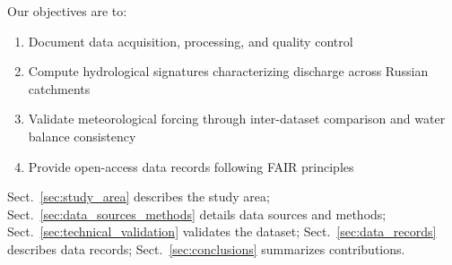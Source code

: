 Our objectives are to:
\begin{enumerate}
    \item Document data acquisition, processing, and quality control
    \item Compute hydrological signatures characterizing discharge across Russian catchments
    \item Validate meteorological forcing through inter-dataset comparison and water balance consistency
    \item Provide open-access data records following FAIR principles~\citep{Wilkinson2016}
\end{enumerate}

Sect.~\ref{sec:study_area} describes the study area;
Sect.~\ref{sec:data_sources_methods} details data sources and methods;
Sect.~\ref{sec:technical_validation} validates the dataset;
Sect.~\ref{sec:data_records} describes data records;
Sect.~\ref{sec:conclusions} summarizes contributions.
